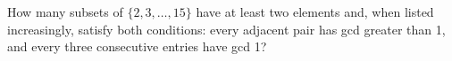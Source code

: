 How many subsets of $\{2,3,\ldots,15\}$ have at least two elements and, when listed increasingly, satisfy both conditions: every adjacent pair has gcd greater than 1, and every three consecutive entries have gcd 1?
